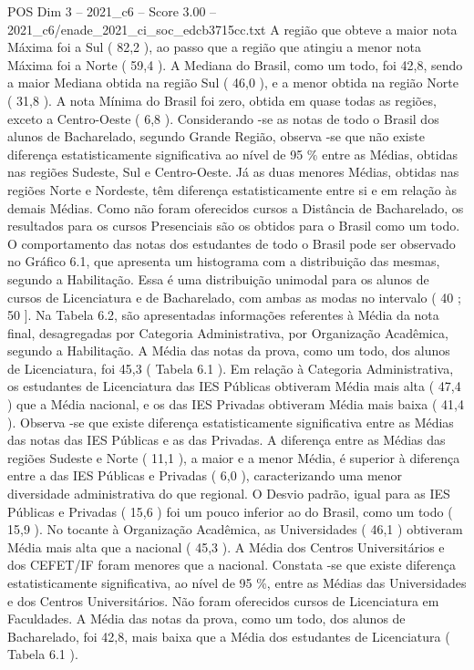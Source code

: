 \begin{textsample}{POS Dim 3 – 2021\_c6 – Score 3.00 – 2021\_c6/enade\_2021\_ci\_soc\_edcb3715cc.txt}
A região que obteve a maior nota Máxima foi a Sul ( 82,2 ), ao passo que a região que atingiu a menor nota Máxima foi a Norte ( 59,4 ).
A Mediana do Brasil, como um todo, foi 42,8, sendo a maior Mediana obtida na região Sul ( 46,0 ), e a menor obtida na região Norte ( 31,8 ).
A nota Mínima do Brasil foi zero, obtida em quase todas as regiões, exceto a Centro-Oeste ( 6,8 ).
Considerando -se as notas de todo o Brasil dos alunos de Bacharelado, segundo Grande Região, observa -se que não existe diferença estatisticamente significativa ao nível de 95 \% entre as Médias, obtidas nas regiões Sudeste, Sul e Centro-Oeste.
Já as duas menores Médias, obtidas nas regiões Norte e Nordeste, têm diferença estatisticamente entre si e em relação às demais Médias.
Como não foram oferecidos cursos a Distância de Bacharelado, os resultados para os cursos Presenciais são os obtidos para o Brasil como um todo.
O comportamento das notas dos estudantes de todo o Brasil pode ser observado no Gráfico 6.1, que apresenta um histograma com a distribuição das mesmas, segundo a Habilitação.
Essa é uma distribuição unimodal para os alunos de cursos de Licenciatura e de Bacharelado, com ambas as modas no intervalo ( 40 ; 50 ].
Na Tabela 6.2, são apresentadas informações referentes à Média da nota final, desagregadas por Categoria Administrativa, por Organização Acadêmica, segundo a Habilitação.
A Média das notas da prova, como um todo, dos alunos de Licenciatura, foi 45,3 ( Tabela 6.1 ).
Em relação à Categoria Administrativa, os estudantes de Licenciatura das IES Públicas obtiveram Média mais alta ( 47,4 ) que a Média nacional, e os das IES Privadas obtiveram Média mais baixa ( 41,4 ).
Observa -se que existe diferença estatisticamente significativa entre as Médias das notas das IES Públicas e as das Privadas.
A diferença entre as Médias das regiões Sudeste e Norte ( 11,1 ), a maior e a menor Média, é superior à diferença entre a das IES Públicas e Privadas ( 6,0 ), caracterizando uma menor diversidade administrativa do que regional.
O Desvio padrão, igual para as IES Públicas e Privadas ( 15,6 ) foi um pouco inferior ao do Brasil, como um todo ( 15,9 ).
No tocante à Organização Acadêmica, as Universidades ( 46,1 ) obtiveram Média mais alta que a nacional ( 45,3 ).
A Média dos Centros Universitários e dos CEFET/IF foram menores que a nacional.
Constata -se que existe diferença estatisticamente significativa, ao nível de 95 \%, entre as Médias das Universidades e dos Centros Universitários.
Não foram oferecidos cursos de Licenciatura em Faculdades.
A Média das notas da prova, como um todo, dos alunos de Bacharelado, foi 42,8, mais baixa que a Média dos estudantes de Licenciatura ( Tabela 6.1 ).

\end{textsample}
